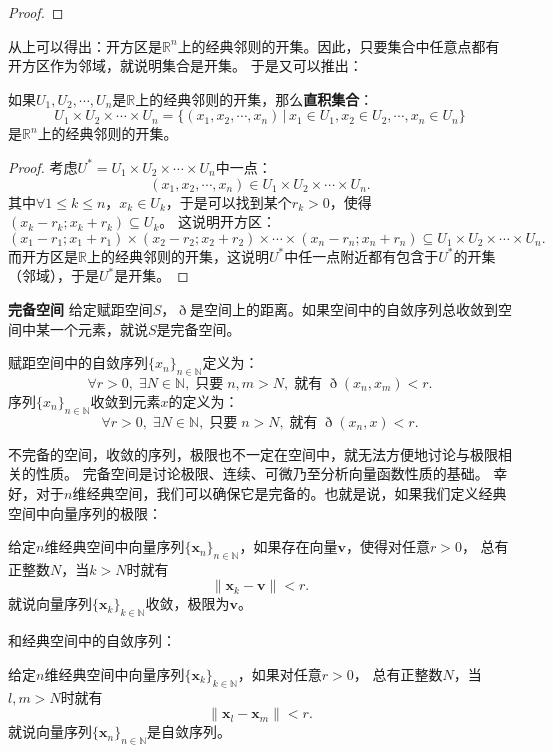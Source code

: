 \documentclass[12pt,UTF8]{ctexbook}
\begin{document}
\begin{appendix}
\begin{proof}
\end{proof}

从上可以得出：开方区是$\mathbb{R}^n$上的经典邻则的开集。因此，只要集合中任意点都有开方区作为邻域，就说明集合是开集。
于是又可以推出：

\begin{tm}\label{tm:b-1-20}
    如果$U_1,U_2,\cdots, U_n$是$\mathbb{R}$上的经典邻则的开集，那么\textbf{直积集合}：
    $$ U_1\times U_2\times \cdots \times U_n = \{(x_1, x_2, \cdots, x_n) \, | \, x_1\in U_1, x_2\in U_2, \cdots , x_n\in U_n\} $$
    是$\mathbb{R}^n$上的经典邻则的开集。
\end{tm}

\begin{proof}
    考虑$U^* = U_1\times U_2\times \cdots \times U_n$中一点：
    $$ (x_1, x_2, \cdots, x_n) \in U_1\times U_2\times \cdots \times U_n. $$
    其中$\forall 1\leqslant k\leqslant n$，$x_k\in U_k$，于是可以找到某个$r_k>0$，使得$(x_k-r_k;x_k+r_k)\subseteq U_k$。
    这说明开方区：
    $$ (x_1-r_1;x_1+r_1)\times(x_2-r_2;x_2+r_2)\times\cdots\times(x_n-r_n;x_n+r_n) \subseteq U_1\times U_2\times \cdots \times U_n. $$
    而开方区是$\mathbb{R}$上的经典邻则的开集，这说明$U^*$中任一点附近都有包含于$U^*$的开集（邻域），于是$U^*$是开集。

\end{proof}

\begin{df}{\textbf{完备空间}}
    给定赋距空间$S$，$\eth$是空间上的距离。如果空间中的自敛序列总收敛到空间中某一个元素，就说$S$是完备空间。

    赋距空间中的自敛序列$\{x_n\}_{n\in\mathbb{N}}$定义为：
    $$ \forall r > 0, \; \exists N\in\mathbb{N}, \; \mbox{只要}\;n,m> N, \;\mbox{就有}\; \eth(x_n, x_m) < r.$$
    序列$\{x_n\}_{n\in\mathbb{N}}$收敛到元素$x$的定义为：
    $$ \forall r > 0, \; \exists N\in\mathbb{N}, \; \mbox{只要}\;n> N, \;\mbox{就有}\; \eth(x_n, x) < r.$$
\end{df}

不完备的空间，收敛的序列，极限也不一定在空间中，就无法方便地讨论与极限相关的性质。
完备空间是讨论极限、连续、可微乃至分析向量函数性质的基础。
幸好，对于$n$维经典空间，我们可以确保它是完备的。也就是说，如果我们定义经典空间中向量序列的极限：
\begin{df}
    给定$n$维经典空间中向量序列$\{\mathbf{x}_n\}_{n\in\mathbb{N}}$，如果存在向量$\mathbf{v}$，使得对任意$r>0$，
    总有正整数$N$，当$k>N$时就有
    $$ \| \mathbf{x}_k - \mathbf{v}\| < r. $$
    就说向量序列$\{\mathbf{x}_k\}_{k\in\mathbb{N}}$收敛，极限为$\mathbf{v}$。
\end{df}
和经典空间中的自敛序列：
\begin{df}
    给定$n$维经典空间中向量序列$\{\mathbf{x}_k\}_{k\in\mathbb{N}}$，如果对任意$r>0$，
    总有正整数$N$，当$l, m>N$时就有
    $$ \| \mathbf{x}_l - \mathbf{x}_m\| < r. $$
    就说向量序列$\{\mathbf{x}_n\}_{n\in\mathbb{N}}$是自敛序列。
\end{df}


\end{appendix}
\end{document}
